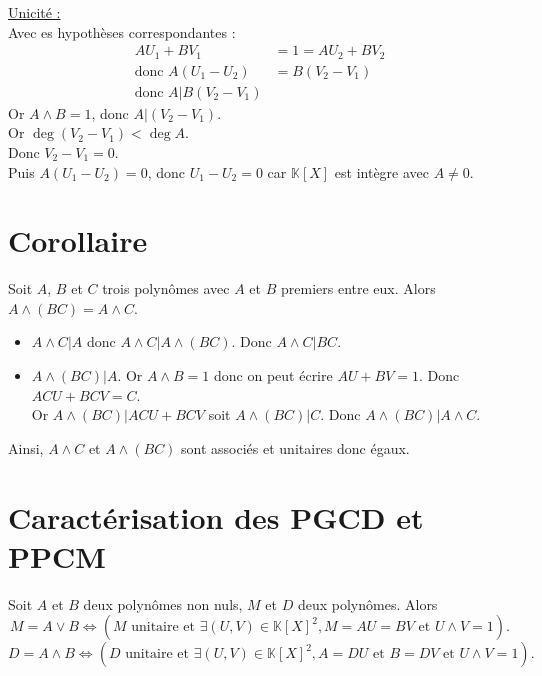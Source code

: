 \documentclass[../main.tex]{subfiles}
\begin{document}
\noindent \underline{Unicité :} \\
Avec es hypothèses correspondantes : 
\begin{align*}
    AU_1 + BV_1 &= 1 = AU_2 + BV_2 \\
    \text{donc } A(U_1 - U_2) &= B(V_2 - V_1) \\
    \text{donc } A | B(V_2 - V_1)
\end{align*}
Or $A \wedge B = 1$, donc $A | (V_2 - V_1)$. \\
Or $\deg (V_2 - V_1) < \deg A$. \\
Donc $V_2 - V_1 = 0$. \\
Puis $A(U_1 - U_2) = 0$, donc $U_1 - U_2 = 0$ car $\mathbb{K}[X]$ est intègre avec $A \neq 0$.

\section{Corollaire}
\begin{tcolorbox}[title=Corollaire 16.43, title filled=false, colframe=orange, colback=orange!10!white]
    Soit $A$, $B$ et $C$ trois polynômes avec $A$ et $B$ premiers entre eux. Alors $A \wedge (BC) = A \wedge C$. 
\end{tcolorbox}

\begin{itemize}
    \item $A \wedge C | A$ donc $A \wedge C | A \wedge (BC)$. Donc $A \wedge C | BC$. 
    \item $A \wedge (BC) | A$. Or $A \wedge B = 1$ donc on peut écrire $AU + BV = 1$. Donc $ACU + BCV = C$. \\
    Or $A \wedge (BC) | ACU + BCV$ soit $A \wedge (BC) | C$. Donc $A \wedge (BC) | A \wedge C$.
\end{itemize}
Ainsi, $A \wedge C$ et $A \wedge (BC)$ sont associés et unitaires donc égaux.

\section{Caractérisation des PGCD et PPCM}
\begin{tcolorbox}[title=Propostion 16.44, title filled=false, colframe=lightblue, colback=lightblue!10!white]
    Soit $A$ et $B$ deux polynômes non nuls, $M$ et $D$ deux polynômes. Alors
    $$ M = A \vee B \Leftrightarrow (M \text{ unitaire et } \exists (U, V) \in \mathbb{K}[X]^2, M = AU = BV \text{ et } U \wedge V = 1). $$
    $$ D = A \wedge B \Leftrightarrow (D \text{ unitaire et } \exists (U, V) \in \mathbb{K}[X]^2, A = DU \text{ et } B = DV \text{ et } U \wedge V = 1). $$
\end{tcolorbox}
\end{document}
